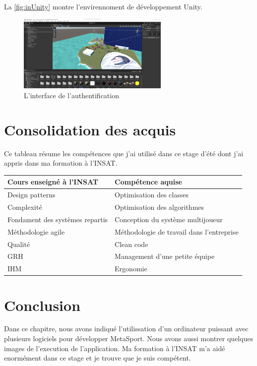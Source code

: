 \documentclass[12pt,a4paper,oneside,french]{book}
\begin{document}
La \autoref{fig:inUnity} montre l'envirennoment de développement Unity.
\begin{figure}[H]
    \centering
    \includegraphics[width=0.65\textwidth]{figure/inUnity.png}
    \caption{L’interface de l’authentification}
    \label{fig:inUnity}
\end{figure}
\noindent



\section{Consolidation des acquis}
Ce tableau résume les compétences que j'ai utilisé dans ce stage d'été dont j'ai appris dans ma formation à l'INSAT.
\begin{table}[H]
\label{tab:acquis}
\centering
\renewcommand{\arraystretch}{1.65}
\begin{tabular}{| C{.5\textwidth} | C{.5\textwidth} |} 
\hline
\textbf{Cours enseigné à l'INSAT} & \textbf{Compétence aquise} \\ 
\hline 
\hline 
Design patterns & Optimisation des classes \\ 
\hline 
Complexité & Optimisation des algorithmes \\ 
\hline 
Fondament des systèmes repartis & Conception du système multijoueur \\ 
\hline 
Méthodologie agile & Méthodologie de travail dans l'entreprise \\ 
\hline 
Qualité & Clean code \\ 
\hline 
GRH & Management d'une petite équipe \\ 
\hline 
IHM & Ergonomie \\ 
\hline 
\end{tabular}
\end{table}


\section*{Conclusion}
Dans ce chapitre, nous avons indiqué l'utilissation d'un ordinateur puissant avec plusieurs logiciels pour développer MetaSport. Nous avons aussi montrer quelques images de l'execution de l'application. Ma formation à l'INSAT m'a aidé enormément dans ce stage et je trouve que je suis compétent.
\end{document}
